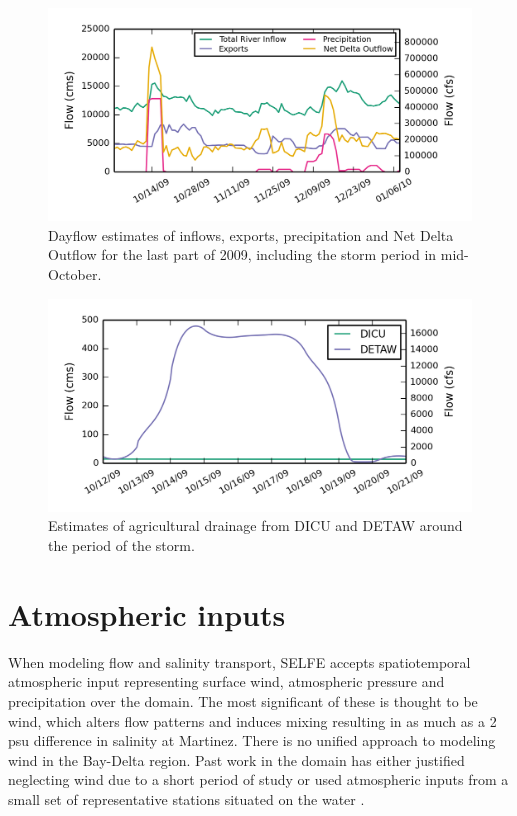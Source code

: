 \begin{figure}
	\centering
		\includegraphics{image/dayflow_oct_2009}
	\caption{Dayflow estimates of inflows, exports, precipitation and Net Delta Outflow for the last part of 2009,
	including the storm period in mid-October.}
	\label{fig:dayflow_oct_2009}
\end{figure}

\begin{figure}
	\centering
		\includegraphics{image/detaw_vs_dicu}
	\caption{Estimates of agricultural drainage from DICU and DETAW around the period of the storm.}
	\label{fig:detaw_vs_dicu}
\end{figure}


\section{Atmospheric inputs}
When modeling flow and salinity transport, SELFE accepts spatiotemporal atmospheric 
input representing surface wind, atmospheric pressure
and precipitation over the domain. The most significant of these is thought 
to be wind, which alters flow patterns and induces mixing
resulting in as much as a 2 psu difference in salinity at Martinez. There is no unified approach to
modeling wind in the Bay-Delta region. Past work in the domain has either justified neglecting 
wind due to a short period of study \citep{Chua2011}
or used atmospheric inputs from a small set of representative 
stations situated on the water \citep{MacWilliams08,MacWilliams09}.

